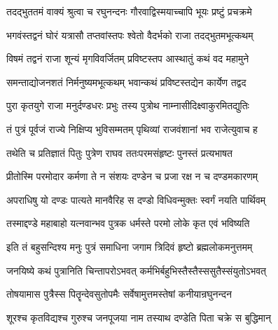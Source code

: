 

\storymeta



\twolineshloka
{तदद्भुततमं वाक्यं श्रुत्वा च रघुनन्दनः}
{गौरवाद्विस्मयाच्चापि भूयः प्रष्टुं प्रचक्रमे}%


\twolineshloka
{भगवंस्तद्वनं घोरं यत्रासौ तप्तवांस्तपः}
{श्वेतो वैदर्भको राजा तदद्भुतमभूत्कथम्}%

\twolineshloka
{विषमं तद्वनं राजा शून्यं मृगविवर्जितम्}
{प्रविष्टस्तप आस्थातुं कथं वद महामुने}%

\twolineshloka
{समन्ताद्योजनशतं निर्मनुष्यमभूत्कथम्}
{भवान्कथं प्रविष्टस्तद्येन कार्येण तद्वद}%


\twolineshloka
{पुरा कृतयुगे राजा मनुर्दण्डधरः प्रभुः}
{तस्य पुत्रोथ नाम्नासीदिक्ष्वाकुरमितद्युतिः}%

\twolineshloka
{तं पुत्रं पूर्वजं राज्ये निक्षिप्य भुविसम्मतम्}
{पृथिव्यां राजवंशानां भव राजेत्युवाच ह}%

\twolineshloka
{तथेति च प्रतिज्ञातं पितुः पुत्रेण राघव}
{ततःपरमसंहृष्टः पुनस्तं प्रत्यभाषत}%

\twolineshloka
{प्रीतोस्मि परमोदार कर्मणा ते न संशयः}
{दण्डेन च प्रजा रक्ष न च दण्डमकारणम्}%

\twolineshloka
{अपराधिषु यो दण्डः पात्यते मानवैरिह}
{स दण्डो विधिवन्मुक्तः स्वर्गं नयति पार्थिवम्}%

\twolineshloka
{तस्माद्दण्डे महाबाहो यत्नवान्भव पुत्रक}
{धर्मस्ते परमो लोके कृत एवं भविष्यति}%

\twolineshloka
{इति तं बहुसन्दिश्य मनुः पुत्रं समाधिना}
{जगाम त्रिदिवं हृष्टो ब्रह्मलोकमनुत्तमम्}%

\twolineshloka
{जनयिष्ये कथं पुत्रानिति चिन्तापरोऽभवत्}
{कर्मभिर्बहुभिस्तैस्तैस्ससुतैस्संयुतोऽभवत्}%

\twolineshloka
{तोषयामास पुत्रैस्स पितॄन्देवसुतोपमैः}
{सर्वेषामुत्तमस्तेषां कनीयान्रघुनन्दन}%

\twolineshloka
{शूरश्च कृतविद्यश्च गुरुश्च जनपूजया}
{नाम तस्याथ दण्डेति पिता चक्रे स बुद्धिमान्}%

